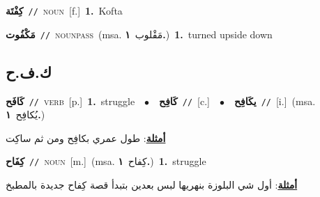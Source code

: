 \documentclass[10pt,a4paper,twoside]{article} %
\begin{document}
\begin{multicols}{2}
{\setlength\topsep{0pt}\textbf{\foreignlanguage{arabic}{كِفْتَة}}\ {\color{gray}\texttt{//}\color{black}}\ \textsc{noun}\ [f.]\ \textbf{1.}~Kofta\ } \vspace{2mm}

{\setlength\topsep{0pt}\textbf{\foreignlanguage{arabic}{مَكْفُوت}}\ {\color{gray}\texttt{//}\color{black}}\ \textsc{noun\textunderscore pass}\ \color{gray}(msa. \foreignlanguage{arabic}{مَقْلوب}~\foreignlanguage{arabic}{\textbf{١.}})\color{black}\ \textbf{1.}~turned upside down\ } \vspace{2mm}

\vspace{-3mm}
\subsection*{\color{blue}\foreignlanguage{arabic}{ك.ف.ح}\color{blue}{}} 

{\setlength\topsep{0pt}\textbf{\foreignlanguage{arabic}{كَافَح}}\ {\color{gray}\texttt{//}\color{black}}\ \textsc{verb}\ [p.]\ \textbf{1.}~struggle\ \ $\bullet$\ \ \setlength\topsep{0pt}\textbf{\foreignlanguage{arabic}{كَافِح}}\ {\color{gray}\texttt{//}\color{black}}\ [c.]\ \ $\bullet$\ \ \setlength\topsep{0pt}\textbf{\foreignlanguage{arabic}{يكَافِح}}\ {\color{gray}\texttt{//}\color{black}}\ [i.]\ \color{gray}(msa. \foreignlanguage{arabic}{يُكافِح}~\foreignlanguage{arabic}{\textbf{١.}})\color{black}\  \begin{flushright}\color{gray}\foreignlanguage{arabic}{\textbf{\underline{\foreignlanguage{arabic}{أمثلة}}}: طول عمري بكافِح ومن ثم ساكِت}\end{flushright}\color{black}} \vspace{2mm}

{\setlength\topsep{0pt}\textbf{\foreignlanguage{arabic}{كِفَاح}}\ {\color{gray}\texttt{//}\color{black}}\ \textsc{noun}\ [m.]\ \color{gray}(msa. \foreignlanguage{arabic}{كِفاح}~\foreignlanguage{arabic}{\textbf{١.}})\color{black}\ \textbf{1.}~struggle\  \begin{flushright}\color{gray}\foreignlanguage{arabic}{\textbf{\underline{\foreignlanguage{arabic}{أمثلة}}}: أول شي البلوزة بنهريها لبس بعدين بتبدأ قصة كِفاح جديدة بالمطبخ}\end{flushright}\color{black}} \vspace{2mm}


\end{multicols}
\end{document}

